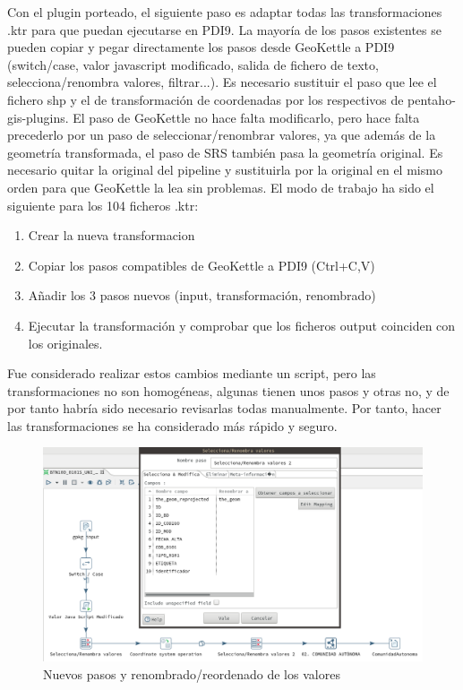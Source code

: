 Con el plugin porteado, el siguiente paso es adaptar todas las transformaciones .ktr para que puedan ejecutarse
en PDI9. La mayoría de los pasos existentes se pueden copiar y pegar directamente los pasos desde GeoKettle a
PDI9 (switch/case, valor javascript modificado, salida de fichero de texto, selecciona/renombra valores,
filtrar...). Es necesario sustituir el paso que lee el fichero shp y el de transformación de coordenadas por los
respectivos de pentaho-gis-plugins. El paso de GeoKettle no hace falta modificarlo, pero hace falta precederlo
por un paso de seleccionar/renombrar valores, ya que además de la geometría transformada, el paso de SRS también
pasa la geometría original. Es necesario quitar la original del pipeline y sustituirla por la original en el
mismo orden para que GeoKettle la lea sin problemas. El modo de trabajo ha sido el siguiente para los 104
ficheros .ktr:

\begin{enumerate}
    \item Crear la nueva transformacion
    \item Copiar los pasos compatibles de GeoKettle a PDI9 (Ctrl+C,V)
    \item Añadir los 3 pasos nuevos (input, transformación, renombrado)
    \item Ejecutar la transformación y comprobar que los ficheros output coinciden con los originales.
\end{enumerate}

Fue considerado realizar estos cambios mediante un script, pero las transformaciones no son homogéneas, algunas
tienen unos pasos y otras no, y de por tanto habría sido necesario revisarlas todas manualmente. Por tanto, hacer
las transformaciones se ha considerado más rápido y seguro.

\begin{figure}[H]
    \includegraphics[width=\textwidth]{images/renombra-geom.png}
    \centering
    \caption{Nuevos pasos y renombrado/reordenado de los valores}
    \label{fig:renombra-geom}
\end{figure}

